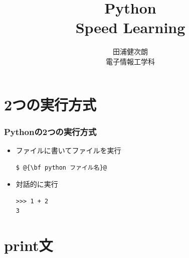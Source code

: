 \documentclass[10pt,dvipdfmx]{beamer}
\title{Python \\ Speed Learning}
\institute{東京大学}
\author{田浦健次朗 \\ 電子情報工学科}
\date{}
\begin{document}
\maketitle





\section{2つの実行方式}
\begin{frame}[fragile]
\frametitle{Pythonの2つの実行方式}
\begin{itemize}
\item ファイルに書いてファイルを実行
\begin{lstlisting}
$ @{\bf python ファイル名}@
\end{lstlisting} %

\item 対話的に実行
\begin{lstlisting}
>>> 1 + 2
3
\end{lstlisting}


\end{itemize}
\end{frame}


\section{print文}
\end{document}
